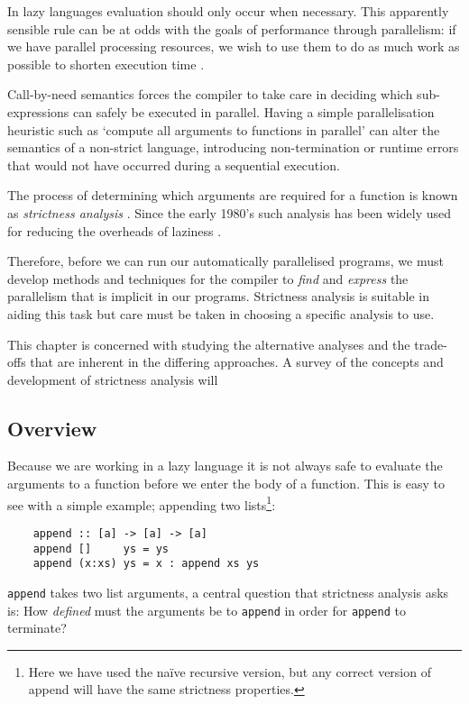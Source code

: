 In lazy languages evaluation should only occur when necessary. This apparently
sensible rule can be at odds with the goals of performance through parallelism:
if we have parallel processing resources, we wish to use them to do as much work
as possible to shorten execution time \citep{tremblay1995impact}.

Call-by-need semantics forces the compiler to take care in deciding which
sub-expressions can safely be executed in parallel.  Having a simple
parallelisation heuristic such as `compute all arguments to functions in
parallel' can alter the semantics of a non-strict language, introducing
non-termination or runtime errors that would not have occurred during a
sequential execution.

The process of determining which arguments are required for a function is known
as \emph{strictness analysis} \citep{mycroft1980theory}. Since the early 1980's
such analysis has been widely used for reducing the overheads of laziness
\citep{spjDemand}.

Therefore, before we can run our automatically parallelised programs, we must
develop methods and techniques for the compiler to \emph{find} and
\emph{express} the parallelism that is implicit in our programs. Strictness
analysis is suitable in aiding this task but care must be taken in choosing
a specific analysis to use.

This chapter is concerned with studying the alternative analyses and the
trade-offs that are inherent in the differing approaches. A survey of the
concepts and development of strictness analysis will


\subsection{Overview}

Because we are working in a lazy language it is not always safe to evaluate the
arguments to a function before we enter the body of a function. This is easy
to see with a simple example; appending two lists\footnote{Here we have used
the na\"{i}ve recursive version, but any correct version of append will
have the same strictness properties.}:

\begin{verbatim}
    append :: [a] -> [a] -> [a]
    append []     ys = ys
    append (x:xs) ys = x : append xs ys
\end{verbatim}

\verb|append| takes two list arguments, a central question that strictness
analysis asks is: How \emph{defined} must the arguments be to \verb|append|
in order for \verb|append| to terminate?

